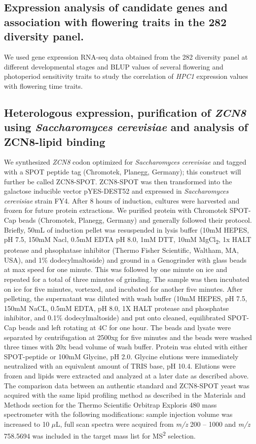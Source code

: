 \documentclass[9pt,twocolumn,twoside,lineno]{biorxiv}
\newcommand{\hpc}{\textit{HPC1}\xspace}
\begin{document}
\subsection{Expression analysis of candidate genes and association with flowering traits in the 282 diversity panel.}
We used gene expression RNA-seq data obtained from the 282 diversity panel at different developmental stages \cite{Kremling2018-gn} and BLUP values of several flowering and photoperiod sensitivity traits \cite{Hung2012-ms} to study the correlation of \hpc expression values with flowering time traits.  
\subsection{Heterologous expression, purification of \textit{ZCN8} using \textit{Saccharomyces cerevisiae} and analysis of ZCN8-lipid binding}
We synthesized \textit{ZCN8} codon optimized for \textit{Saccharomyces cerevisiae} and tagged with a SPOT peptide tag (Chromotek, Planegg, Germany); this construct will further be called ZCN8-SPOT. 
ZCN8-SPOT was then transformed into the galactose inducible vector pYES-DEST52 and expressed in \textit{Saccharomyces cerevisiae} strain FY4. 
After 8 hours of induction, cultures were harvested and frozen for future protein extractions. 
We purified protein with Chromotek SPOT-Cap beads (Chromotek, Planegg, Germany) and generally followed their protocol. 
Briefly, 50mL of induction pellet was resuspended in lysis buffer (10mM HEPES, pH 7.5, 150mM Nacl, 0.5mM EDTA pH 8.0, 1mM DTT, 10mM MgCl\textsubscript{2}, 1x HALT protease and phsophatase inhibitor (Thermo Fisher Scientific, Waltham, MA, USA), and 1\% dodecylmaltoside) and ground in a Genogrinder with glass beads at max speed for one minute.
This was followed by one minute on ice and repeated for a total of three minutes of grinding.
The sample was then incubated on ice for five minutes, vortexed, and incubated for another five minutes. 
After pelleting, the supernatant was diluted with wash buffer (10mM HEPES, pH 7.5, 150mM NaCL, 0.5mM EDTA, pH 8.0, 1X HALT protease and phosphatse inhibitor, and 0.1\% dodecylmaltoside) and put onto cleaned, equilibrated SPOT-Cap beads and left rotating at 4\textdegree C for one hour.
The beads and lysate were separated by centrifugation at 2500xg for five minutes and the beads were washed three times with 20x bead volume of wash buffer. 
Protein was eluted with either SPOT-peptide or 100mM Glycine, pH 2.0. 
Glycine elutions were immediately neutralized with an equivalent amount of TRIS base, pH 10.4.
Elutions were frozen and lipids were extracted and analyzed at a later date as described above. 
The comparison data between an authentic standard and ZCN8-SPOT yeast was acquired with the same lipid profiling method as described in the Materials and Methods section for the Thermo Scientific Orbitrap Exploris 480 mass spectrometer with the following modifications: sample injection volume was increased to 10 $\mu$L, full scan spectra were acquired from \emph{m/z} 200 – 1000 and \emph{m/z} 758.5694 was included in the target mass list for MS\textsuperscript{2} selection.
\end{document}
